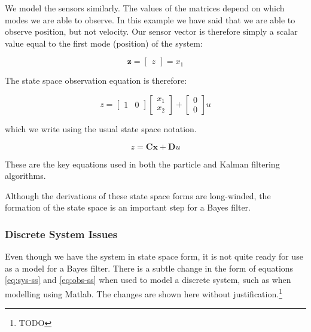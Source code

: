 We model the sensors similarly. The values of the matrices depend on which modes
we are able to observe. In this example we have said that we are able to observe
position, but not velocity. Our sensor vector is therefore simply a scalar
value equal to
the first mode (position) of the system:

\begin{equation}
    \mathbf{z} =
    \begin{bmatrix}
        z
    \end{bmatrix}
    = x_{1}
\end{equation}

The state space observation equation is therefore:

\begin{equation}
    z =
    \begin{bmatrix}
        1 & 0
    \end{bmatrix}
    \begin{bmatrix}
        x_{1} \\
        x_{2}
    \end{bmatrix}
    +
    \begin{bmatrix}
        0 \\
        0
    \end{bmatrix}
    u
\end{equation}

which we write using the usual state space notation.

\begin{equation}\label{eq:obs-ss}
z = \mathbf{C}\mathbf{x} + \mathbf{D}u
\end{equation}

These are the key equations used in both the particle and Kalman filtering
algorithms.

Although the derivations of these state space forms are long-winded, the
formation of the state space is an important step for a Bayes filter.

\subsubsection{Discrete System Issues}\label{sec:discrete}
Even though we have the system in state space form, it is not quite ready for
use as a model for a Bayes filter. There is a subtle change in the form of equations
\ref{eq:sys-ss} and \ref{eq:obs-ss} when used to model a discrete system,
such as when modelling using Matlab. The
changes are shown here without justification.\footnote{TODO}


